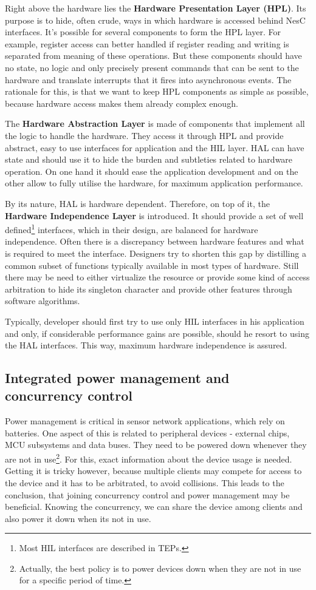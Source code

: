 Right above the hardware lies the {\bf Hardware Presentation Layer
(HPL)}. Its purpose is to hide, often crude, ways in which hardware is
accessed behind NesC interfaces. It's possible for several
components to form the HPL layer. For example, register access can
better handled if register reading and writing is separated from
meaning of these operations. But these components should have no
state, no logic and only precisely present commands that can be sent
to the hardware and translate interrupts that it fires into
asynchronous events. The rationale for this, is that we want to keep
HPL components as simple as possible, because hardware access makes
them already complex enough.

The {\bf Hardware Abstraction Layer} is made of components that
implement all the logic to handle the hardware. They access it through
HPL and provide abstract, easy to use interfaces for application and
the HIL layer. HAL can have state and should use it to hide the burden
and subtleties related to hardware operation. On one hand it should
ease the application development and on the other allow to fully
utilise the hardware, for maximum application performance.

By its nature, HAL is hardware dependent. Therefore, on top of it,
the {\bf Hardware Independence Layer} is introduced. It should provide
a set of well defined\footnote{Most HIL interfaces are described in
TEPs.} interfaces, which in their design, are balanced for hardware
independence. Often there is a discrepancy between hardware features
and what is required to meet the interface.  Designers try to shorten
this gap by distilling a common subset of functions typically
available in most types of hardware. Still there may be need to either
virtualize the resource or provide some kind of access arbitration to
hide its singleton character and provide other features through
software algorithms.

Typically, developer should first try to use only HIL interfaces in
his application and only, if considerable performance gains are possible,
should he resort to using the HAL interfaces. This way, maximum
hardware independence is assured.

\subsection{Integrated power management and concurrency control}

Power management is critical in sensor network applications, which
rely on batteries. One aspect of this is related to peripheral devices
- external chips, MCU subsystems and data buses. They need to be
powered down whenever they are not in use\footnote{Actually, the best
policy is to power devices down when they are not in use for a specific
period of time.}. For this, exact information about the device usage
is needed.  Getting it is tricky however, because multiple clients may
compete for access to the device and it has to be arbitrated, to avoid
collisions.  This leads to the conclusion, that joining concurrency
control and power management may be beneficial. Knowing the
concurrency, we can share the device among clients and also power it
down when its not in use.

